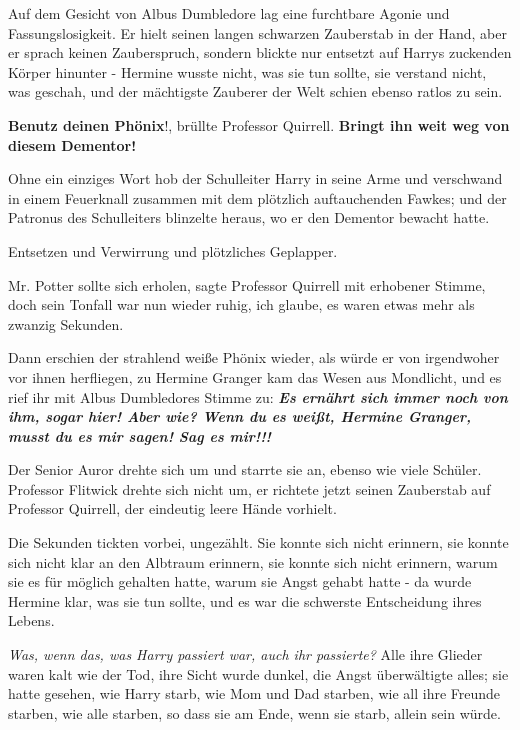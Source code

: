 Auf dem Gesicht von Albus Dumbledore lag eine furchtbare Agonie und
Fassungslosigkeit. Er hielt seinen langen schwarzen Zauberstab in der Hand, aber
er sprach keinen Zauberspruch, sondern blickte nur entsetzt auf Harrys zuckenden
Körper hinunter - Hermine wusste nicht, was sie tun sollte, sie verstand nicht,
was geschah, und der mächtigste Zauberer der Welt schien ebenso ratlos zu sein.

\glqq{}\textbf{Benutz deinen Phönix}!\grqq{}, brüllte Professor Quirrell. \glqq{}
\textbf{Bringt ihn weit weg von diesem Dementor!}\grqq{}

Ohne ein einziges Wort hob der Schulleiter Harry in seine Arme und verschwand in
einem Feuerknall zusammen mit dem plötzlich auftauchenden Fawkes; und der
Patronus des Schulleiters blinzelte heraus, wo er den Dementor bewacht hatte.

Entsetzen und Verwirrung und plötzliches Geplapper.

\glqq{}Mr. Potter sollte sich erholen\grqq{}, sagte Professor Quirrell mit
erhobener Stimme, doch sein Tonfall war nun wieder ruhig, \glqq{}ich glaube, es
waren etwas mehr als zwanzig Sekunden.\grqq{}

Dann erschien der strahlend weiße Phönix wieder, als würde er von irgendwoher
vor ihnen herfliegen, zu Hermine Granger kam das Wesen aus Mondlicht, und es
rief ihr mit Albus Dumbledores Stimme zu: \textbf{\emph{ \glqq{}Es ernährt sich
immer noch von ihm, sogar hier! Aber wie? Wenn du es weißt, Hermine Granger,
musst du es mir sagen! Sag es mir!!!\grqq{}}}

Der Senior Auror drehte sich um und starrte sie an, ebenso wie viele Schüler.
Professor Flitwick drehte sich nicht um, er richtete jetzt seinen Zauberstab auf
Professor Quirrell, der eindeutig leere Hände vorhielt.

Die Sekunden tickten vorbei, ungezählt. Sie konnte sich nicht erinnern, sie
konnte sich nicht klar an den Albtraum erinnern, sie konnte sich nicht erinnern,
warum sie es für möglich gehalten hatte, warum sie Angst gehabt hatte - da wurde
Hermine klar, was sie tun sollte, und es war die schwerste Entscheidung ihres
Lebens.

\emph{Was, wenn das, was Harry passiert war, auch ihr passierte?}
Alle ihre Glieder waren kalt wie der Tod, ihre Sicht wurde dunkel, die Angst
überwältigte alles; sie hatte gesehen, wie Harry starb, wie Mom und Dad starben,
wie all ihre Freunde starben, wie alle starben, so dass sie am Ende, wenn sie
starb, allein sein würde.

